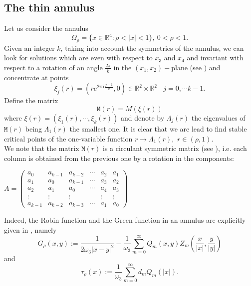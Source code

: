 \documentclass[11pt,a4paper]{amsart}
\theoremstyle{definition}
\renewcommand{\(}{\left(}
\renewcommand{\)}{\right)}
\begin{document}
\subsection{The  thin  annulus}
Let us consider  the annulus
\begin{equation*}
\Omega_{\rho} = \{ x \in \mathbb{R}^{4} : \rho<|x|<1 \},\ 0<\rho<1.
\end{equation*} 
Given an integer $k$, taking into account the symmetries of the annulus, 
  we can look for solutions which are even with respect to $x_3$ and $x_4$ and   invariant  with respect to a rotation of an angle $\frac{2\pi}{k}$
  in the $(x_1,x_2)-$plane (see \cite{dfm2,prey}) and concentrate at points
\begin{equation*}
\xi_{j}(r) =(re^{2\pi \mathtt i \frac{j-1}{k}},0) \in \mathbb{R}^{2} \times \mathbb{R}^{2} \ \ \ \ j=0, \cdots k-1.
\end{equation*}
 Define the matrix $$\mathtt{M}(r) = M(\xi(r))$$ where $\xi(r)=(\xi_1(r), \cdots, \xi_{k}(r))$ and denote by $\Lambda_{j}(r)$ the eigenvalues of $\mathtt{M}(r)$ being $\Lambda_{1}(r)$ the smallest one. It is clear that we are lead to find stable critical points of the one-variable function $r\to\Lambda_1(r),$ $r\in(\rho,1).$\\
We note that the matrix $\mathtt{M}(r)$ is a circulant symmetric matrix (see \cite{MS}), i.e. each column is obtained from the previous one by a rotation in the components:
\begin{center}
$A= \left( \begin{matrix}
a_0 & a_{k-1} & a_{k-2} & \cdots & a_2 & a_1 \\
a_1 & a_0 & a_{k-1} & \cdots & a_3 & a_2 \\
a_2 & a_1 & a_0 & \cdots & a_4 & a_3 \\
\vdots & \vdots & \vdots & & \vdots & \vdots \\
a_{k-1} & a_{k-2} & a_{k-3} & \cdots & a_1 & a_0 
\end{matrix} \right)$
\end{center}
Indeed,  the Robin function and   the Green function in an annulus are explicitly given in \cite{GV}, namely
\begin{equation}\label{Greenanello}
G_\rho(x, y):=\frac{1}{2\omega_3|x-y|^2}-\frac{1}{\omega_3}\sum_{m=0}^{\infty} Q_m(x, y) Z_m\left(\frac{x}{|x|}, \frac{y}{|y|}\right)\end{equation}
and
\begin{equation}\label{robinanello}
\tau_{\rho}(x):=\frac{1}{\omega_3}\sum_{m=0}^{\infty}d_mQ_m(|x|).\end{equation}
\end{document}
